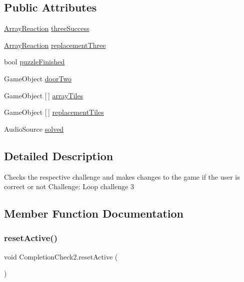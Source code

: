 \subsection*{Public Attributes}
\begin{DoxyCompactItemize}
\item 
\hyperlink{class_array_reaction}{Array\+Reaction} \hyperlink{class_completion_check2_a5304ab78c9a420165fa605e25ac5bdd6}{three\+Success}
\item 
\hyperlink{class_array_reaction}{Array\+Reaction} \hyperlink{class_completion_check2_a56390eb4e63df9107df6f1dbe6b36c34}{replacement\+Three}
\item 
bool \hyperlink{class_completion_check2_a88f888fbd3883fe7c46c6377aedd389d}{puzzle\+Finished}
\item 
Game\+Object \hyperlink{class_completion_check2_a8e504c1480b264be827cce35f4006d7e}{door\+Two}
\item 
Game\+Object \mbox{[}$\,$\mbox{]} \hyperlink{class_completion_check2_a3e576206fcbe2ffdc58b6538b10c57d2}{array\+Tiles}
\item 
Game\+Object \mbox{[}$\,$\mbox{]} \hyperlink{class_completion_check2_a712fc392f7a484070dea22d804bf0ce9}{replacement\+Tiles}
\item 
Audio\+Source \hyperlink{class_completion_check2_ab543e719625d9de2a48b6817c41c3432}{solved}
\end{DoxyCompactItemize}


\subsection{Detailed Description}
Checks the respective challenge and makes changes to the game if the user is correct or not Challenge\+: Loop challenge 3 

\subsection{Member Function Documentation}
\mbox{\label{class_completion_check2_acc81070efa47ed19e94287be80bba5da}} 
\subsubsection{\texorpdfstring{reset\+Active()}{resetActive()}}
{\footnotesize\ttfamily void Completion\+Check2.\+reset\+Active (\begin{DoxyParamCaption}{ }\end{DoxyParamCaption})}

